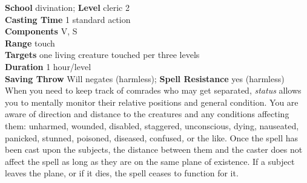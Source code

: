 \textbf{School} divination; \textbf{Level} cleric 2\\
\textbf{Casting Time} 1 standard action\\
\textbf{Components} V, S\\
\textbf{Range} touch\\
\textbf{Targets} one living creature touched per three levels\\
\textbf{Duration} 1 hour/level\\
\textbf{Saving Throw }Will negates (harmless); \textbf{Spell Resistance} yes (harmless)\\
When you need to keep track of comrades who may get separated, \textit{status }allows you to mentally monitor their relative positions and general condition. You are aware of direction and distance to the creatures and any conditions affecting them: unharmed, wounded, disabled, staggered, unconscious, dying, nauseated, panicked, stunned, poisoned, diseased, confused\textit{, }or the like. Once the spell has been cast upon the subjects, the distance between them and the caster does not affect the spell as long as they are on the same plane of existence. If a subject leaves the plane, or if it dies, the spell ceases to function for it.\\

